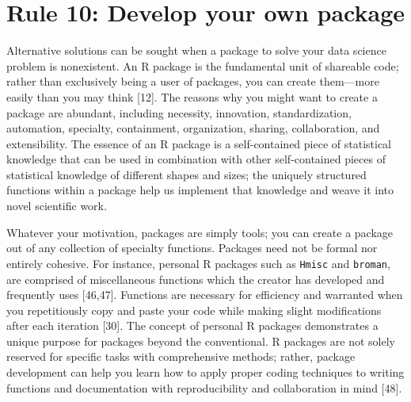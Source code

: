 \documentclass[10pt,letterpaper]{article}
\begin{document}
\hypertarget{rule-10-develop-your-own-package}{%
\section{Rule 10: Develop your own
package}\label{rule-10-develop-your-own-package}}

Alternative solutions can be sought when a package to solve your data
science problem is nonexistent. An R package is the fundamental unit of
shareable code; rather than exclusively being a user of packages, you
can create them---more easily than you may think {[}12{]}. The reasons
why you might want to create a package are abundant, including
necessity, innovation, standardization, automation, specialty,
containment, organization, sharing, collaboration, and extensibility.
The essence of an R package is a self-contained piece of statistical
knowledge that can be used in combination with other self-contained
pieces of statistical knowledge of different shapes and sizes; the
uniquely structured functions within a package help us implement that
knowledge and weave it into novel scientific work.

Whatever your motivation, packages are simply tools; you can create a
package out of any collection of specialty functions. Packages need not
be formal nor entirely cohesive. For instance, personal R packages such
as \texttt{Hmisc} and \texttt{broman}, are comprised of miscellaneous
functions which the creator has developed and frequently uses
{[}46,47{]}. Functions are necessary for efficiency and warranted when
you repetitiously copy and paste your code while making slight
modifications after each iteration {[}30{]}. The concept of personal R
packages demonstrates a unique purpose for packages beyond the
conventional. R packages are not solely reserved for specific tasks with
comprehensive methods; rather, package development can help you learn
how to apply proper coding techniques to writing functions and
documentation with reproducibility and collaboration in mind {[}48{]}.
\end{document}
